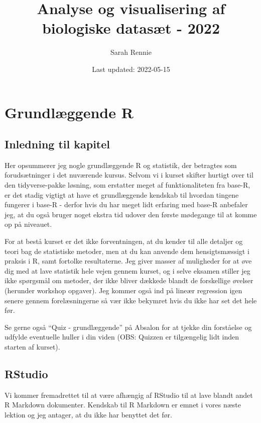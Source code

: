 \documentclass[
]{book}
\title{Analyse og visualisering af biologiske datasæt - 2022}
\author{Sarah Rennie}
\date{Last updated: 2022-05-15}
\begin{document}
\maketitle

{
\setcounter{tocdepth}{1}
\tableofcontents
}
\hypertarget{baser}{%
\chapter{Grundlæggende R}\label{baser}}

\hypertarget{inledning-til-kapitel}{%
\section{Inledning til kapitel}\label{inledning-til-kapitel}}

Her opsummerer jeg nogle grundlæggende R og statistik, der betragtes som forudsætninger i det nuværende kursus. Selvom vi i kurset skifter hurtigt over til den tidyverse-pakke løsning, som erstatter meget af funktionaliteten fra base-R, er det stadig vigtigt at have et grundlæggende kendskab til hvordan tingene fungerer i base-R - derfor hvis du har meget lidt erfaring med base-R anbefaler jeg, at du også bruger noget ekstra tid udover den første mødegange til at komme op på niveauet.

For at bestå kurset er det ikke forventningen, at du kender til alle detaljer og teori bag de statistiske metoder, men at du kan anvende dem hensigtsmæssigt i praksis i R, samt fortolke resultaterne. Jeg giver masser af muligheder for at øve dig med at lave statistik hele vejen gennem kurset, og i selve eksamen stiller jeg ikke spørgsmål om metoder, der ikke bliver dækkede blandt de forskellige øvelser (herunder workshop opgaver). Jeg kommer også ind på lineær regression igen senere gennem forelæsningerne så vær ikke bekymret hvis du ikke har set det hele før.

Se gerne også ``Quiz - grundlæggende'' på Absalon for at tjekke din forståelse og udfylde eventuelle huller i din viden (OBS: Quizzen er tilgængelig lidt inden starten af kurset).

\hypertarget{rstudio}{%
\section{RStudio}\label{rstudio}}

Vi kommer fremadrettet til at være afhængig af RStudio til at lave blandt andet R Markdown dokumenter. Kendskab til R Markdown er emnet i vores næste lektion og jeg antager, at du ikke har benyttet det før.
\end{document}
